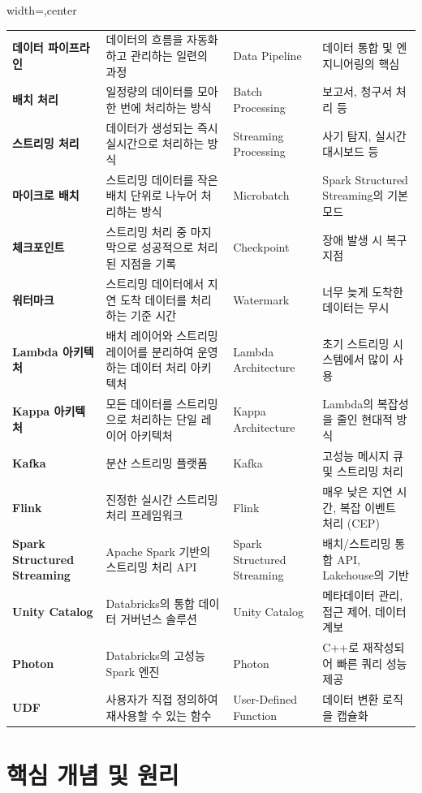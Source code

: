 \documentclass[11pt,a4paper]{article}
\theoremstyle{definition}
\begin{document}
\begin{adjustbox}{width=\textwidth,center}
\begin{tabular}{llll}
\textbf{데이터 파이프라인} & 데이터의 흐름을 자동화하고 관리하는 일련의 과정 & Data Pipeline & 데이터 통합 및 엔지니어링의 핵심 \\
\textbf{배치 처리} & 일정량의 데이터를 모아 한 번에 처리하는 방식 & Batch Processing & 보고서, 청구서 처리 등 \\
\textbf{스트리밍 처리} & 데이터가 생성되는 즉시 실시간으로 처리하는 방식 & Streaming Processing & 사기 탐지, 실시간 대시보드 등 \\
\textbf{마이크로 배치} & 스트리밍 데이터를 작은 배치 단위로 나누어 처리하는 방식 & Microbatch & Spark Structured Streaming의 기본 모드 \\
\textbf{체크포인트} & 스트리밍 처리 중 마지막으로 성공적으로 처리된 지점을 기록 & Checkpoint & 장애 발생 시 복구 지점 \\
\textbf{워터마크} & 스트리밍 데이터에서 지연 도착 데이터를 처리하는 기준 시간 & Watermark & 너무 늦게 도착한 데이터는 무시 \\
\textbf{Lambda 아키텍처} & 배치 레이어와 스트리밍 레이어를 분리하여 운영하는 데이터 처리 아키텍처 & Lambda Architecture & 초기 스트리밍 시스템에서 많이 사용 \\
\textbf{Kappa 아키텍처} & 모든 데이터를 스트리밍으로 처리하는 단일 레이어 아키텍처 & Kappa Architecture & Lambda의 복잡성을 줄인 현대적 방식 \\
\textbf{Kafka} & 분산 스트리밍 플랫폼 & Kafka & 고성능 메시지 큐 및 스트리밍 처리 \\
\textbf{Flink} & 진정한 실시간 스트리밍 처리 프레임워크 & Flink & 매우 낮은 지연 시간, 복잡 이벤트 처리 (CEP) \\
\textbf{Spark Structured Streaming} & Apache Spark 기반의 스트리밍 처리 API & Spark Structured Streaming & 배치/스트리밍 통합 API, Lakehouse의 기반 \\
\textbf{Unity Catalog} & Databricks의 통합 데이터 거버넌스 솔루션 & Unity Catalog & 메타데이터 관리, 접근 제어, 데이터 계보 \\
\textbf{Photon} & Databricks의 고성능 Spark 엔진 & Photon & C++로 재작성되어 빠른 쿼리 성능 제공 \\
\textbf{UDF} & 사용자가 직접 정의하여 재사용할 수 있는 함수 & User-Defined Function & 데이터 변환 로직을 캡슐화 \\
\bottomrule
\end{tabular}
\end{adjustbox}

\newpage

\section{핵심 개념 및 원리}
\end{document}
